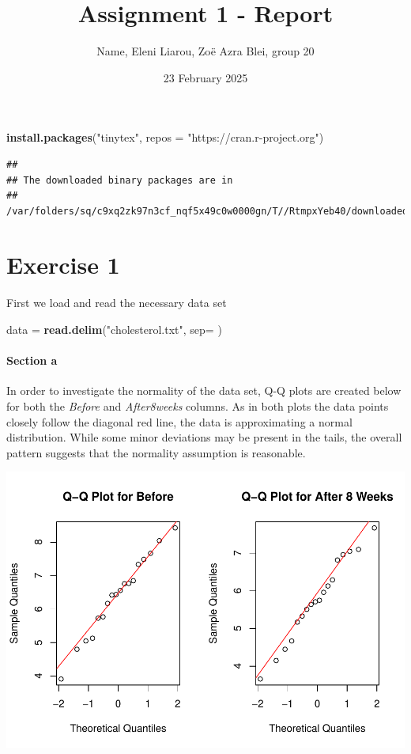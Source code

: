 \documentclass[
  11pt,
]{article}
\title{Assignment 1 - Report}
\author{Name, Eleni Liarou, Zoë Azra Blei, group 20}
\date{23 February 2025}
\newenvironment{Shaded}{\begin{snugshade}}{\end{snugshade}}
\newcommand{\AttributeTok}[1]{\textcolor[rgb]{0.13,0.29,0.53}{#1}}
\newcommand{\FunctionTok}[1]{\textcolor[rgb]{0.13,0.29,0.53}{\textbf{#1}}}
\newcommand{\NormalTok}[1]{#1}
\newcommand{\OtherTok}[1]{\textcolor[rgb]{0.56,0.35,0.01}{#1}}
\newcommand{\StringTok}[1]{\textcolor[rgb]{0.31,0.60,0.02}{#1}}
\begin{document}
\maketitle

\begin{Shaded}
\begin{Highlighting}[]
\FunctionTok{install.packages}\NormalTok{(}\StringTok{"tinytex"}\NormalTok{, }\AttributeTok{repos =} \StringTok{"https://cran.r{-}project.org"}\NormalTok{)}
\end{Highlighting}
\end{Shaded}

\begin{verbatim}
## 
## The downloaded binary packages are in
##  /var/folders/sq/c9xq2zk97n3cf_nqf5x49c0w0000gn/T//RtmpxYeb40/downloaded_packages
\end{verbatim}

\section{Exercise 1}\label{exercise-1}

First we load and read the necessary data set

\begin{Shaded}
\begin{Highlighting}[]
\NormalTok{data }\OtherTok{=} \FunctionTok{read.delim}\NormalTok{(}\StringTok{"cholesterol.txt"}\NormalTok{, }\AttributeTok{sep=}\StringTok{\textquotesingle{} \textquotesingle{}}\NormalTok{)}
\end{Highlighting}
\end{Shaded}

\paragraph{Section a}\label{section-a}

In order to investigate the normality of the data set, Q-Q plots are
created below for both the \emph{Before} and \emph{After8weeks} columns.
As in both plots the data points closely follow the diagonal red line,
the data is approximating a normal distribution. While some minor
deviations may be present in the tails, the overall pattern suggests
that the normality assumption is reasonable.

\includegraphics{ReportAssignment1_files/figure-latex/unnamed-chunk-3-1.pdf}
\end{document}
